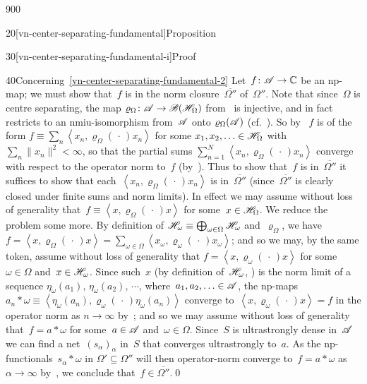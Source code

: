 \begin{parsec}{900}
\begin{point}{20}[vn-center-separating-fundamental]{Proposition}
\begin{point}{30}[vn-center-separating-fundamental-i]{Proof}
\begin{point}{40}{Concerning~\ref{vn-center-separating-fundamental-2}}%
Let~$f\colon \mathscr{A}\to\mathbb{C}$ be an np-map;
we must show that~$f$ is in 
the norm closure~$\overline{\Omega''}$ of~$\Omega''$.
Note that since~$\Omega$ is centre separating,
the map $\varrho_\Omega\colon \mathscr{A}\to\mathscr{B}(\mathscr{H}_\Omega)$
from~
is injective,
and in fact restricts
to an nmiu-isomorphism
from~$\mathscr{A}$ onto $\varrho_\Omega(\mathscr{A})$
(cf.~).
So by~
$f$ is of the form $f\equiv 
\sum_n \left<x_n,\varrho_\Omega(\,\cdot\,)x_n\right>$
for some $x_1,x_2,\dotsc \in\mathscr{H}_\Omega$
with $\sum_n \|x_n\|^2<\infty$,
so that the partial sums
$\sum_{n=1}^N \left<x_n,\varrho_\Omega(\,\cdot\,)x_n\right>$
converge with respect to the operator norm to~$f$
(by~).
Thus to show that~$f$ is in~$\overline{\Omega''}$
it suffices to show that each~$\left<x_n,\varrho_\Omega(\,\cdot\,)x_n\right>$
is in~$\overline{\Omega''}$
(since~$\overline{\Omega''}$ is clearly closed
under finite sums and norm limits).
In effect
we may assume 
without loss of generality
that~$f\equiv \left<x,\varrho_\Omega(\,\cdot\,)x\right>$
for some~$x\in \mathscr{H}_\Omega$.
We reduce the problem some more.
By definition 
of $\mathscr{H}_\omega\equiv \bigoplus_{\omega\in\Omega}\mathscr{H}_\omega$
and~$\varrho_\Omega$,
we have $f=\left<x,\varrho_\Omega(\,\cdot\,)x\right>
= \sum_{\omega\in \Omega} 
\left<x_\omega,\varrho_\omega(\,\cdot\,)x_\omega\right>$;
and so we may, by the same token, assume without loss of generality
that $f=\left<x,\varrho_\omega(\,\cdot\,)x\right>$
for some~$\omega\in \Omega$
and~$x\in \mathscr{H}_\omega$.
Since such~$x$ (by definition of~$\mathscr{H}_\omega$, 
)
is the norm limit of
a sequence $\eta_\omega(a_1),\,\eta_\omega(a_2),\,
\dotsb$,
where~$a_1,a_2,\dotsc\in\mathscr{A}$,
the np-maps $a_n\ast \omega\equiv 
\left<\eta_\omega(a_n),\varrho_\omega(\,\cdot\,)\eta_\omega(a_n)\right>$
converge to~$\left<x,\varrho_\omega(\,\cdot\,) x\right>=f$
in the operator norm as $n\to\infty$ by~;
and so we may assume without loss of generality
that~$f=a\ast \omega$ for some~$a\in\mathscr{A}$ and~$\omega\in \Omega$.
Since~$S$ is ultrastrongly dense in~$\mathscr{A}$
we can find a net~$(s_\alpha)_\alpha$
in~$S$ that converges ultrastrongly to~$a$.
As the np-functionals~$s_\alpha \ast \omega$
in $\Omega'\subseteq \Omega''$
will then
operator-norm converge
to~$f= a\ast \omega$
as $\alpha\to\infty$
by~,
we conclude that~$f\in \overline{\Omega''}$.\qed
\end{point}
\end{point}
\end{point}
\end{parsec}
